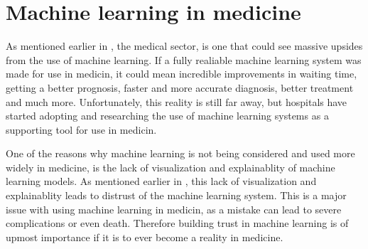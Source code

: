 \section{Machine learning in medicine}
\label{Machine_learning_medicine}
As mentioned earlier in , the medical sector, is one that could see massive upsides from the use of machine learning.
If a fully realiable machine learning system was made for use in medicin, it could mean incredible improvements in waiting time, getting a better prognosis, faster and more accurate diagnosis, better treatment and much more.\cite{rajkomar2019machine}
Unfortunately, this reality is still far away, but hospitals have started adopting and researching the use of machine learning systems as a supporting tool for use in medicin.\cite{Elhakim2021mammography}\cite{lalehzarian2021machine}

One of the reasons why machine learning is not being considered and used more widely in medicine, is the lack of visualization and explainablity of machine learning models.\cite{vellido2020importance}\cite{chatzimparmpas2020state}
As mentioned earlier in , this lack of visualization and explainablity leads to distrust of the machine learning system.\cite{yang2020visual}
This is a major issue with using machine learning in medicin, as a mistake can lead to severe complications or even death. Therefore building trust in machine learning is of upmost importance if it is to ever become a reality in medicine.\cite{vayena2018machine}